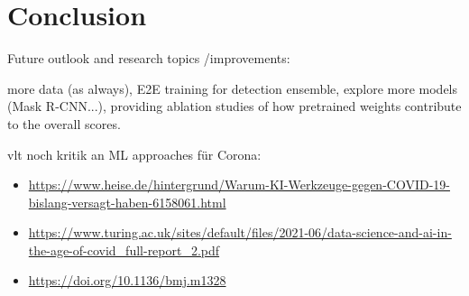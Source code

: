 \chapter{Conclusion}\label{chapter:conclusion}


Future outlook and research topics /improvements:

more data (as always), E2E training for detection ensemble, explore more models (Mask R-CNN...), providing ablation studies of how pretrained weights contribute to the overall scores.

vlt noch kritik an ML approaches für Corona:
 \begin{itemize}
 	\item \url{https://www.heise.de/hintergrund/Warum-KI-Werkzeuge-gegen-COVID-19-bislang-versagt-haben-6158061.html}
 	\item \url{https://www.turing.ac.uk/sites/default/files/2021-06/data-science-and-ai-in-the-age-of-covid_full-report_2.pdf}
 	\item \url{https://doi.org/10.1136/bmj.m1328}
 \end{itemize}